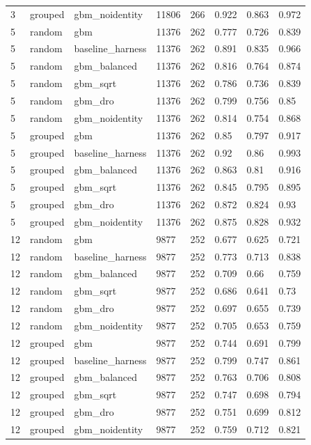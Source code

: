 \begin{tabular}{llllllll}
3 & grouped & gbm\_noidentity & 11806 & 266 & 0.922 & 0.863 & 0.972 \\
5 & random & gbm & 11376 & 262 & 0.777 & 0.726 & 0.839 \\
5 & random & baseline\_harness & 11376 & 262 & 0.891 & 0.835 & 0.966 \\
5 & random & gbm\_balanced & 11376 & 262 & 0.816 & 0.764 & 0.874 \\
5 & random & gbm\_sqrt & 11376 & 262 & 0.786 & 0.736 & 0.839 \\
5 & random & gbm\_dro & 11376 & 262 & 0.799 & 0.756 & 0.85 \\
5 & random & gbm\_noidentity & 11376 & 262 & 0.814 & 0.754 & 0.868 \\
5 & grouped & gbm & 11376 & 262 & 0.85 & 0.797 & 0.917 \\
5 & grouped & baseline\_harness & 11376 & 262 & 0.92 & 0.86 & 0.993 \\
5 & grouped & gbm\_balanced & 11376 & 262 & 0.863 & 0.81 & 0.916 \\
5 & grouped & gbm\_sqrt & 11376 & 262 & 0.845 & 0.795 & 0.895 \\
5 & grouped & gbm\_dro & 11376 & 262 & 0.872 & 0.824 & 0.93 \\
5 & grouped & gbm\_noidentity & 11376 & 262 & 0.875 & 0.828 & 0.932 \\
12 & random & gbm & 9877 & 252 & 0.677 & 0.625 & 0.721 \\
12 & random & baseline\_harness & 9877 & 252 & 0.773 & 0.713 & 0.838 \\
12 & random & gbm\_balanced & 9877 & 252 & 0.709 & 0.66 & 0.759 \\
12 & random & gbm\_sqrt & 9877 & 252 & 0.686 & 0.641 & 0.73 \\
12 & random & gbm\_dro & 9877 & 252 & 0.697 & 0.655 & 0.739 \\
12 & random & gbm\_noidentity & 9877 & 252 & 0.705 & 0.653 & 0.759 \\
12 & grouped & gbm & 9877 & 252 & 0.744 & 0.691 & 0.799 \\
12 & grouped & baseline\_harness & 9877 & 252 & 0.799 & 0.747 & 0.861 \\
12 & grouped & gbm\_balanced & 9877 & 252 & 0.763 & 0.706 & 0.808 \\
12 & grouped & gbm\_sqrt & 9877 & 252 & 0.747 & 0.698 & 0.794 \\
12 & grouped & gbm\_dro & 9877 & 252 & 0.751 & 0.699 & 0.812 \\
12 & grouped & gbm\_noidentity & 9877 & 252 & 0.759 & 0.712 & 0.821 \\
\bottomrule
\end{tabular}